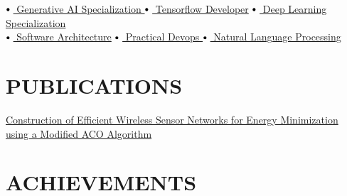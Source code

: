 \documentclass[letterpaper,11pt]{article}
\newcommand\sbullet[1][.5]{\mathbin{\vcenter{\hbox{\scalebox{#1}{$\bullet$}}}}}
\begin{document}
$\sbullet[.75] \hspace{0.1cm}${\href{https://www.coursera.org/account/accomplishments/specialization/certificate/HTW6T9JV6TWB}{ Generative AI Specialization }} \hspace{1cm}
$\sbullet[.75] \hspace{0.1cm}${\href{https://www.coursera.org/account/accomplishments/specialization/certificate/VM84M4KYXB6Y}{ Tensorflow Developer}} \hspace{1.1cm}
$\sbullet[.75] \hspace{0.1cm}${\href{https://www.coursera.org/account/accomplishments/specialization/certificate/8C3LD42HQ2J6}{ Deep Learning Specialization}} \\
$\sbullet[.75] \hspace{0.1cm}${\href{https://www.udemy.com/certificate/UC-84855734-1563-4924-ae9a-8da1be5e8bdb/}{ Software Architecture}} \hspace{2.3cm}
$\sbullet[.75] \hspace{0.1cm}${\href{https://www.udemy.com/certificate/UC-a39907b6-261c-44ec-aa44-9a58cbefebd9/}{ Practical Devops }} \hspace{1.7cm}
$\sbullet[.75] \hspace{0.1cm}${\href{https://www.coursera.org/account/accomplishments/specialization/certificate/SHTEESHQQ8WR}{ Natural Language Processing}} \\


\section{PUBLICATIONS}
\noindent
\href{https://doi.org/10.2174/2210327911666210120122610}{Construction of Efficient Wireless Sensor Networks for Energy Minimization using a Modified ACO Algorithm} 


\section{ACHIEVEMENTS}
\noindent
\end{document}
